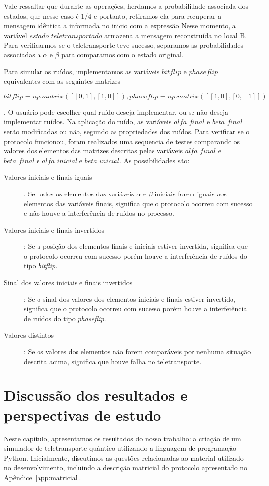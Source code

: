 Vale ressaltar que durante as operações, herdamos a probabilidade associada dos estados, que nesse caso é $1/4$ e portanto, retiramos ela para recuperar a mensagem idêntica a informada no inicio com a expressão Nesse momento, a variável \textit{$estado\_teletransportado$} armazena a mensagem reconstruída no local B. Para verificarmos se o teletransporte teve sucesso, separamos as probabilidades associadas a $\alpha$ e $\beta$ para comparamos com o estado original.

Para simular os ruídos, implementamos as variáveis \textit{$bitflip$}	e \textit{$phaseflip$} equivalentes com as seguintes matrizes\begin{tiny}\textbf{$bitflip = np.matrix([[0, 1], [1, 0]]), phaseflip = np.matrix([[1, 0], [0, -1]])$}\end{tiny}. O usuário pode escolher qual ruído deseja implementar, ou se não deseja implementar ruídos.
Na aplicação do ruído, as variáveis $alfa\_final$ e $beta\_final$ serão modificadas ou não, segundo as propriedades dos ruídos. Para verificar se o protocolo funcionou, foram realizados uma sequencia de testes comparando os valores dos elementos das matrizes descritas pelas variáveis $alfa\_final$ e $beta\_final$ e $alfa\_inicial$ e $beta\_inicial$. As possibilidades são:
\begin{description}
\item [Valores iniciais e finais iguais]: Se todos os elementos das variáveis $\alpha$ e $\beta$ iniciais forem iguais aos elementos das variáveis finais, significa que o protocolo ocorreu com sucesso e não houve a interferência de ruídos no processo.
\item [Valores iniciais e finais invertidos]: Se a posição dos elementos finais e iniciais estiver invertida, significa que o protocolo ocorreu com sucesso porém houve a interferência de ruídos do tipo \textit{bitflip}.
\item [Sinal dos valores iniciais e finais invertidos]: Se o sinal dos valores dos elementos iniciais e finais estiver invertido, significa que o protocolo ocorreu com sucesso porém houve a interferência de ruídos do tipo \textit{phaseflip}.
\item [Valores distintos]: Se os valores dos elementos não forem comparáveis por nenhuma situação descrita acima, significa que houve falha no teletransporte.
\end{description}

\clearpage

\chapter{Discussão dos resultados e perspectivas de estudo}\label{sec:resultados}
Neste capítulo, apresentamos os resultados do nosso trabalho: a criação de um simulador de teletransporte quântico utilizando a linguagem de programação Python. Inicialmente, discutimos as questões relacionadas ao material utilizado no desenvolvimento, incluindo a descrição matricial do protocolo apresentado no Apêndice~\ref{app:matricial}.

